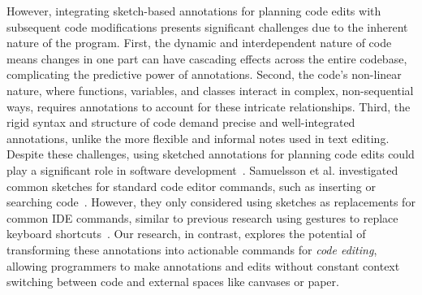 



However, integrating sketch-based annotations for planning code edits with subsequent code modifications presents significant challenges due to the inherent nature of the program.
First, the dynamic and interdependent nature of code means changes in one part can have cascading effects across the entire codebase, complicating the predictive power of annotations. Second, the code's non-linear nature, where functions, variables, and classes interact in complex, non-sequential ways, requires annotations to account for these intricate relationships. Third, the rigid syntax and structure of code demand precise and well-integrated annotations, unlike the more flexible and informal notes used in text editing.
Despite these challenges, using sketched annotations for planning code edits could play a significant role in software development~\cite{cherubini_lets_2007}.
Samuelsson et al. investigated common sketches for standard code editor commands, such as inserting or searching code~\cite{samuelsson_towards_2023}. However, they only considered using sketches as replacements for common IDE commands, similar to previous research using gestures to replace keyboard shortcuts~\cite{raab_refactorpad_2013}.
Our research, in contrast, explores the potential of transforming these annotations into actionable commands for \textit{code editing}, allowing programmers to make annotations and edits without constant context switching between code and external spaces like canvases or paper.



